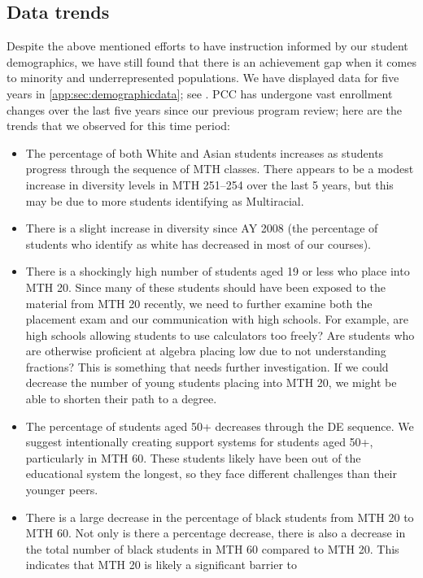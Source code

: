 \subsection{Data trends}\label{needs:sec:trends}
Despite the above mentioned efforts to have instruction informed by our student
demographics, we have still found that there is an achievement gap when it
comes to minority and underrepresented populations. We have displayed data for
five years in \vref{app:sec:demographicdata}; see
. PCC has
undergone vast enrollment changes over the last five years since our previous
program review; here are the trends that we observed for this time period:
\begin{itemize}
	\item The percentage of both White and Asian students increases as students
	progress through the sequence of MTH classes. There appears to be a
	modest increase in diversity levels in MTH 251--254 over the last 5
	years, but this may be due to more students identifying as Multiracial.
	\item There is a slight increase in diversity since AY 2008 (the percentage
	of students who identify as white has decreased in most of our courses).
	\item There is a shockingly high number of students aged 19 or less who
	place into MTH 20. Since many of these students should have been exposed
	to the material from MTH 20 recently, we need to further examine both the placement
	exam and our communication with high schools. For example, are high
	schools allowing students to use calculators too freely? Are students who
	are otherwise proficient at algebra placing low due to not understanding
	fractions? This is something that needs further investigation. If we
	could decrease the number of young students placing into MTH 20, we might
	be able to shorten their path to a degree.
	\item The percentage of students aged 50+ decreases through the DE
	sequence. We suggest intentionally creating support systems for students
	aged 50+, particularly in MTH 60. These students likely have been out of
	the educational system the longest, so they face different challenges
	than their younger peers.
	\item There is a large decrease in the percentage of black students from
	MTH 20 to MTH 60. Not only is there a percentage decrease, there is also
	a decrease in the total number of black students in MTH 60 compared to
	MTH 20. This indicates that MTH 20 is likely a significant barrier to

\end{itemize}
